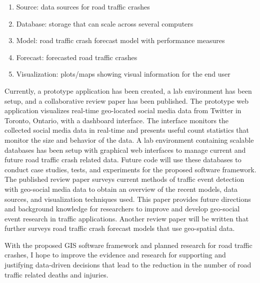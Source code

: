 \begin{enumerate}[label=\alph*)]
	\item Source: data sources for road traffic crashes
	\item Database: storage that can scale across several computers
	\item Model: road traffic crash forecast model with performance measures
	\item Forecast: forecasted road traffic crashes
	\item Visualization: plots/maps showing visual information for the end user
\end{enumerate}

Currently, a prototype application has been created, a lab environment has been setup, and a collaborative review paper has been published. The prototype web application visualizes real-time geo-located social media data from Twitter in Toronto, Ontario, with a dashboard interface. The interface monitors the collected social media data in real-time and presents useful count statistics that monitor the size and behavior of the data. A lab environment containing scalable databases has been setup with graphical web interfaces to manage current and future road traffic crash related data. Future code will use these databases to conduct case studies, tests, and experiments for the proposed software framework. The published review paper surveys current methods of traffic event detection with geo-social media data to obtain an overview of the recent models, data sources, and visualization techniques used. This paper provides future directions and background knowledge for researchers to improve and develop geo-social event research in traffic applications. Another review paper will be written that further surveys road traffic crash forecast models that use geo-spatial data.

With the proposed GIS software framework and planned research for road traffic crashes, I hope to improve the evidence and research for supporting and justifying data-driven decisions that lead to the reduction in the number of road traffic related deaths and injuries.

\newpage

